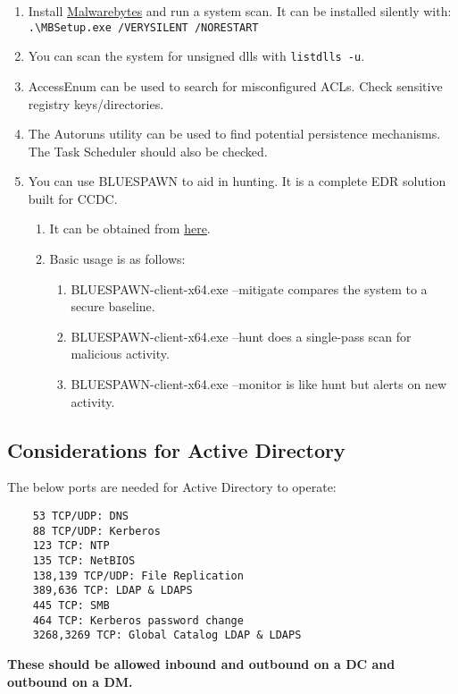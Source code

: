 \documentclass[12pt,letterpaper]{article}
\def\code#1{\textcolor{iris}{\texttt{#1}}}
\def\bf#1{\textbf{#1}}
\begin{document}
\begin{enumerate}
	\item Install \href{https://downloads.malwarebytes.com/file/mb-windows}{Malwarebytes} and run a system scan. It can be installed silently with: \\
		\code{.\textbackslash{}MBSetup.exe /VERYSILENT /NORESTART}
	\item You can scan the system for unsigned dlls with \code{listdlls -u}.
	\item AccessEnum can be used to search for misconfigured ACLs. Check sensitive registry keys/directories.
	\item The Autoruns utility can be used to find potential persistence mechanisms. The Task Scheduler should also be checked.
	\item You can use BLUESPAWN to aid in hunting. It is a complete EDR solution built for CCDC.
	\begin{enumerate}
		\item It can be obtained from \href{https://github.com/ION28/BLUESPAWN/releases/download/v0.5.1-alpha/BLUESPAWN-client-x64.exe}{here}.
		\item Basic usage is as follows:
		\begin{enumerate}
			\item BLUESPAWN-client-x64.exe --mitigate compares the system to a secure baseline.
			\item BLUESPAWN-client-x64.exe --hunt does a single-pass scan for malicious activity.
			\item BLUESPAWN-client-x64.exe --monitor is like hunt but alerts on new activity.
		\end{enumerate}
	\end{enumerate}
\end{enumerate}

\subsection{Considerations for Active Directory}

The below ports are needed for Active Directory to operate:
\begin{verbatim}
	53 TCP/UDP: DNS
	88 TCP/UDP: Kerberos
	123 TCP: NTP
	135 TCP: NetBIOS
	138,139 TCP/UDP: File Replication
	389,636 TCP: LDAP & LDAPS
	445 TCP: SMB
	464 TCP: Kerberos password change
	3268,3269 TCP: Global Catalog LDAP & LDAPS
\end{verbatim}
\bf{These should be allowed inbound and outbound on a DC and outbound on a DM.}
\end{document}
